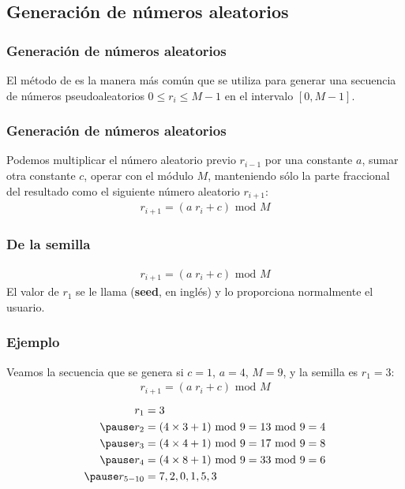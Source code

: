 \documentclass[12pt]{beamer}
\begin{document}
\subsection{Generación de números aleatorios}

\begin{frame}
\frametitle{Generación de números aleatorios}
El método de  es la manera más común que se utiliza para generar una secuencia de números pseudoaleatorios $0 \leq r_{i} \leq M - 1$ en el intervalo $[0, M - 1]$.
\end{frame}
\begin{frame}
\frametitle{Generación de números aleatorios}
Podemos multiplicar el número aleatorio previo $r_{i-1}$ por una constante $a$, \pause sumar otra constante $c$, \pause operar con el módulo $M$, manteniendo sólo la parte fraccional del resultado como el siguiente número aleatorio $r_{i+1}$:
\pause
\begin{align*}
r_{i+1} = (a \; r_{i} + c) \text{ mod } M
\end{align*}
\end{frame}
\begin{frame}
\frametitle{De la semilla}
\begin{align*}
r_{i+1} = (a \; r_{i} + c) \text{ mod } M
\end{align*}
El valor de $r_{1}$ se le llama  (\textbf{seed}, en inglés) y lo proporciona normalmente el usuario.
\end{frame}
\begin{frame}
\frametitle{Ejemplo}
Veamos la secuencia que se genera si $c = 1$, $a = 4$, $M = 9$, y la semilla es $r_{1} = 3$:
\pause
\begin{align*}
r_{i+1} = (a \; r_{i} + c) \mbox{ mod } M 
\end{align*}
\begin{eqnarray*}
\begin{aligned}
r_{1} &= 3 \\ \pause
r_{2} &= (4 \times 3  + 1) \mbox{ mod } 9 = 13 \mbox{ mod } 9 = 4 \\ \pause
r_{3} &= (4 \times 4  + 1) \mbox{ mod } 9 = 17 \mbox{ mod } 9 = 8 \\ \pause
r_{4} &= (4 \times 8  + 1) \mbox{ mod } 9 = 33 \mbox{ mod } 9 = 6 \\ \pause
r_{5 - 10} &= 7, 2, 0, 1, 5, 3
\end{aligned}
\end{eqnarray*}
\end{frame}
\end{document}
